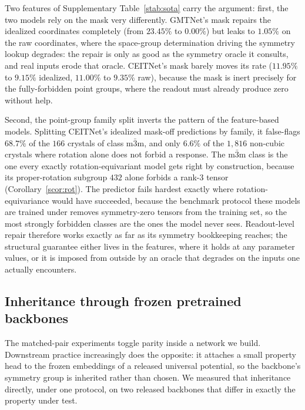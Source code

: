Two features of Supplementary Table~\ref{stab:sota} carry the argument: first, the two models rely on the mask very differently. GMTNet's mask repairs the idealized coordinates completely (from $23.45\%$ to $0.00\%$) but leaks to $1.05\%$ on the raw coordinates, where the space-group determination driving the symmetry lookup degrades: the repair is only as good as the symmetry oracle it consults, and real inputs erode that oracle. CEITNet's mask barely moves its rate ($11.95\%$ to $9.15\%$ idealized, $11.00\%$ to $9.35\%$ raw), because the mask is inert precisely for the fully-forbidden point groups, where the readout must already produce zero without help.

Second, the point-group family split inverts the pattern of the feature-based models. Splitting CEITNet's idealized mask-off predictions by family, it false-flags $68.7\%$ of the $166$ crystals of class m$\bar 3$m, and only $6.6\%$ of the $1{,}816$ non-cubic crystals where rotation alone does not forbid a response. The m$\bar 3$m class is the one every exactly rotation-equivariant model gets right by construction, because its proper-rotation subgroup $432$ alone forbids a rank-3 tensor (Corollary~\ref{scor:rot}). The predictor fails hardest exactly where rotation-equivariance would have succeeded, because the benchmark protocol these models are trained under removes symmetry-zero tensors from the training set, so the most strongly forbidden classes are the ones the model never sees. Readout-level repair therefore works exactly as far as its symmetry bookkeeping reaches; the structural guarantee either lives in the features, where it holds at any parameter values, or it is imposed from outside by an oracle that degrades on the inputs one actually encounters.


\subsection*{Inheritance through frozen pretrained backbones}\label{snote:frozen}

The matched-pair experiments toggle parity inside a network we build. Downstream practice increasingly does the opposite: it attaches a small property head to the frozen embeddings of a released universal potential, so the backbone's symmetry group is inherited rather than chosen. We measured that inheritance directly, under one protocol, on two released backbones that differ in exactly the property under test.

